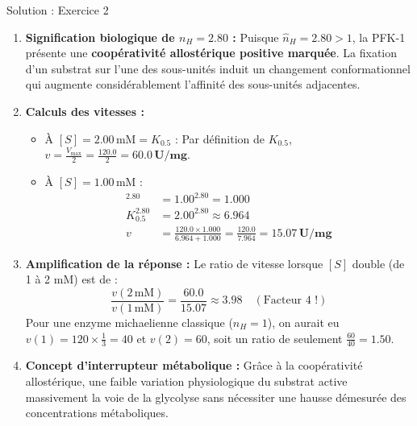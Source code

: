\documentclass[11pt,a4paper]{article}
\begin{document}
\begin{solutionbox}{Solution : Exercice 2}
\begin{enumerate}[label=\textbf{\alph*.}]
  \item \textbf{Signification biologique de $n_H = 2.80$ :}
  Puisque $\hat{n}_H = 2.80 > 1$, la PFK-1 présente une \textbf{coopérativité allostérique positive marquée}. La fixation d'un substrat sur l'une des sous-unités induit un changement conformationnel qui augmente considérablement l'affinité des sous-unités adjacentes.
  \item \textbf{Calculs des vitesses :}
  \begin{itemize}
    \item À $[S] = 2.00\,\text{mM} = K_{0.5}$ :
    Par définition de $K_{0.5}$, $v = \frac{V_{\max}}{2} = \frac{120.0}{2} = \mathbf{60.0\,\text{U/mg}}$.
    \item À $[S] = 1.00\,\text{mM}$ :
    \begin{align*}
      [S]^{2.80} &= 1.00^{2.80} = 1.000 \\
      K_{0.5}^{2.80} &= 2.00^{2.80} \approx 6.964 \\
      v &= \frac{120.0 \times 1.000}{6.964 + 1.000} = \frac{120.0}{7.964} = \mathbf{15.07\,\text{U/mg}}
    \end{align*}
  \end{itemize}
  \item \textbf{Amplification de la réponse :}
  Le ratio de vitesse lorsque $[S]$ double (de 1 à 2 mM) est de :
  \begin{equation*}
    \frac{v(2\,\text{mM})}{v(1\,\text{mM})} = \frac{60.0}{15.07} \approx \mathbf{3.98} \quad (\text{Facteur 4 !})
  \end{equation*}
  Pour une enzyme michaelienne classique ($n_H = 1$), on aurait eu $v(1) = 120 \times \frac{1}{3} = 40$ et $v(2) = 60$, soit un ratio de seulement $\frac{60}{40} = \mathbf{1.50}$.
  \item \textbf{Concept d'interrupteur métabolique :}
  Grâce à la coopérativité allostérique, une faible variation physiologique du substrat active massivement la voie de la glycolyse sans nécessiter une hausse démesurée des concentrations métaboliques.
\end{enumerate}
\end{solutionbox}
\end{document}
